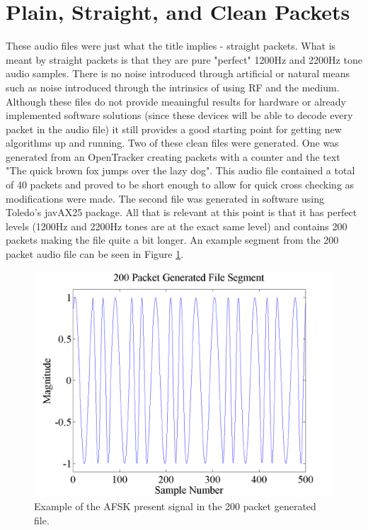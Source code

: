 \section{Plain, Straight, and Clean Packets}
These audio files were just what the title implies - straight packets. What is meant by straight packets is that they are pure "perfect" 1200Hz and 2200Hz tone audio samples. There is no noise introduced through artificial or natural means such as noise introduced through the intrinsics of using RF and the medium. Although these files do not provide meaningful results for hardware or already implemented software solutions (since these devices will be able to decode every packet in the audio file) it still provides a good starting point for getting new algorithms up and running. Two of these clean files were generated. One was generated from an OpenTracker creating packets with a counter and the text "The quick brown fox jumps over the lazy dog". This audio file contained a total of 40 packets and proved to be short enough to allow for quick cross checking as modifications were made. The second file was generated in software using Toledo's javAX25 package. All that is relevant at this point is that it has perfect levels (1200Hz and 2200Hz tones are at the exact same level) and contains 200 packets making the file quite a bit longer. An example segment from the 200 packet audio file can be seen in Figure \ref{gen200Segment}.
\begin{figure}
  \centering
	\includegraphics[width=0.75\linewidth]{images/200PacketGeneratedFileSegment.png} 
	\caption{Example of the AFSK present signal in the 200 packet generated file.}
   \label{gen200Segment}
\end{figure}

